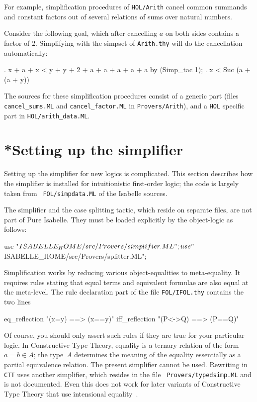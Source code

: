 For example, simplification procedures  of
\texttt{HOL/Arith} cancel common summands and constant factors out of
several relations of sums over natural numbers.

Consider the following goal, which after cancelling $a$ on both sides
contains a factor of $2$.  Simplifying with the simpset of
\texttt{Arith.thy} will do the cancellation automatically:
\begin{ttbox}
{. x + a + x < y + y + 2 + a + a + a + a + a}
by (Simp_tac 1);
{. x < Suc (a + (a + y))}
\end{ttbox}

\medskip

The {\ML} sources for these simplification procedures consist of a
generic part (files \texttt{cancel_sums.ML} and
\texttt{cancel_factor.ML} in \texttt{Provers/Arith}), and a
\texttt{HOL} specific part in \texttt{HOL/arith_data.ML}.


\section{*Setting up the simplifier}\label{sec:setting-up-simp}

Setting up the simplifier for new logics is complicated.  This section
describes how the simplifier is installed for intuitionistic
first-order logic; the code is largely taken from {\tt
  FOL/simpdata.ML} of the Isabelle sources.

The simplifier and the case splitting tactic, which reside on separate
files, are not part of Pure Isabelle.  They must be loaded explicitly
by the object-logic as follows:
\begin{ttbox}
use "$ISABELLE_HOME/src/Provers/simplifier.ML";
use "$ISABELLE_HOME/src/Provers/splitter.ML";
\end{ttbox}

Simplification works by reducing various object-equalities to
meta-equality.  It requires rules stating that equal terms and equivalent
formulae are also equal at the meta-level.  The rule declaration part of
the file {\tt FOL/IFOL.thy} contains the two lines
\begin{ttbox}
eq_reflection   "(x=y)   ==> (x==y)"
iff_reflection  "(P<->Q) ==> (P==Q)"
\end{ttbox}
Of course, you should only assert such rules if they are true for your
particular logic.  In Constructive Type Theory, equality is a ternary
relation of the form $a=b\in A$; the type~$A$ determines the meaning
of the equality essentially as a partial equivalence relation.  The
present simplifier cannot be used.  Rewriting in {\tt CTT} uses
another simplifier, which resides in the file {\tt
  Provers/typedsimp.ML} and is not documented.  Even this does not
work for later variants of Constructive Type Theory that use
intensional equality~\cite{nordstrom90}.


